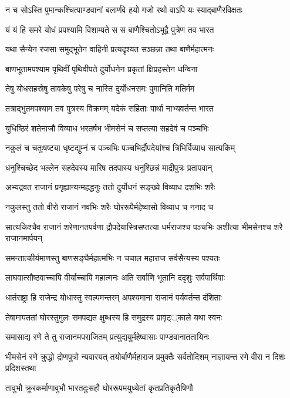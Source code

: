 \twolineshloka
{न च सोऽस्ति पुमान्कश्चित्पाण्डवानां बलार्णवे}
{हयो गजो रथो वाऽपि यः स्याद्बाणैरविक्षतः}


\twolineshloka
{यं यं हि समरे योधं प्रपश्यामि विशाम्पते}
{स स बाणैश्चितोऽभूद्वै पुत्रेण तव भारत}


\twolineshloka
{यथा सैन्येन रजसा समुद्भूतेन वाहिनी}
{प्रत्यदृश्यत सञ्छन्ना तथा बाणैर्महात्मनः}


\twolineshloka
{बाणभूतामपश्याम पृथिवीं पृथिवीपते}
{दुर्योधनेन प्रकृतां क्षिप्रहस्तेन धन्विना}


\twolineshloka
{तेषु योधसहस्रेषु तावकेषु परेषु च}
{नास्ति दुर्योधनसमः पुमानिति मतिर्मम}


\twolineshloka
{तत्राद्भुतमपश्याम तव पुत्रस्य विक्रमम्}
{यदेकं सहिताः पार्था नाभ्यवर्तन्त भारत}


\twolineshloka
{युधिष्ठिरं शतेनाजौ विव्याध भरतर्षभ}
{भीमसेनं च सप्तत्या सहदेवं च पञ्चभिः}


\twolineshloka
{नकुलं च चतुःषष्ट्या धृष्टद्युम्नं च पञ्चभिः}
{पञ्चभिर्द्रौपदेयांश्च त्रिभिर्विव्याध सात्यकिम्}


\twolineshloka
{धनुश्चिच्छेद भल्लेन सहदेवस्य मारिष}
{तदपास्य धनुश्छिन्नं माद्रीपुत्रः प्रतापवान्}


\twolineshloka
{अभ्यद्रवत राजानं प्रगृह्यान्यन्महद्धनुः}
{ततो दुर्योधनं सङ्ख्ये विव्याध दशभिः शरैः}


\twolineshloka
{नकुलस्तु ततो वीरो राजानं नवभिः शरैः}
{घोररूपैर्महेष्वासो विव्याध च ननाद च}


\threelineshloka
{सात्यकिश्चैव राजानं शरेणानतपर्वणा}
{द्रौपदेयास्त्रिसप्तत्या धर्मराजश्च पञ्चभिः}
{अशीत्या भीमसेनश्च शरै राजानमार्पयन्}


\twolineshloka
{समन्तात्कीर्यमाणस्तु बाणसङ्घैर्महात्मभिः}
{न चचाल महाराज सर्वसैन्यस्य पश्यतः}


\twolineshloka
{लाघवात्सौष्ठवाच्चापि वीर्याच्चापि महात्मनः}
{अति सर्वाणि भूतानि ददृशुः सर्वपार्थिवाः}


\twolineshloka
{धार्तराष्ट्रा हि राजेन्द्र योधास्तु स्वल्पमन्तरम्}
{अपश्यमाना राजानं पर्यवर्तन्त दंशिताः}


\twolineshloka
{तेषामापततां घोरस्तुमुलः समपद्यत}
{क्षुब्धस्य हि समुद्रस्य प्रावृट््काले यथा स्वनः}


\twolineshloka
{समासाद्य रणे ते तु राजानमपराजितम्}
{प्रत्युद्ययुर्महेष्वासाः पाण्डवानाततायिनः}


\threelineshloka
{भीमसेनं रणे क्रुद्धो द्रोणपुत्रो न्यवारयत्}
{तयोर्बाणैर्महाराज प्रमुक्तैः सर्वतोदिशम्}
{नाज्ञायन्त रणे वीरा न दिशः प्रदिशस्तथा}


\twolineshloka
{तावुभौ क्रूरकर्माणावुभौ भारतदुःसहौ}
{घोररूपमयुध्येतां कृतप्रतिकृतैषिणौ}


